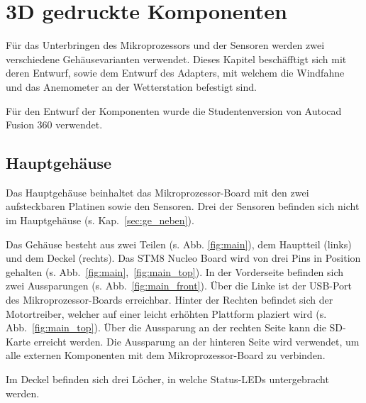 \section{3D gedruckte Komponenten}\label{sec:gehaeuse}
Für das Unterbringen des Mikroprozessors und der Sensoren werden zwei verschiedene Gehäusevarianten verwendet. Dieses Kapitel beschäfftigt sich mit deren Entwurf, sowie dem Entwurf des Adapters, mit welchem die Windfahne und das Anemometer an der Wetterstation befestigt sind.

Für den Entwurf der Komponenten wurde die Studentenversion von Autocad Fusion 360 verwendet.

\subsection{Hauptgehäuse}\label{sec:ge_haupt}
Das Hauptgehäuse beinhaltet das Mikroprozessor-Board mit den zwei aufsteckbaren Platinen sowie den Sensoren. Drei der Sensoren befinden sich nicht im Hauptgehäuse (s. Kap.~\ref{sec:ge_neben}).

Das Gehäuse besteht aus zwei Teilen (s. Abb. \ref{fig:main}), dem Hauptteil (links) und dem Deckel (rechts). Das STM8 Nucleo Board wird von drei Pins in Position gehalten (s. Abb.~\ref{fig:main},~\ref{fig:main_top}). In der Vorderseite befinden sich zwei Aussparungen (s. Abb.~\ref{fig:main_front}). Über die Linke ist der USB-Port des Mikroprozessor-Boards erreichbar. Hinter der Rechten befindet sich der Motortreiber, welcher auf einer leicht erhöhten Plattform plaziert wird (s. Abb.~\ref{fig:main_top}). Über die Aussparung an der rechten Seite kann die SD-Karte erreicht werden. Die Aussparung an der hinteren Seite wird verwendet, um alle externen Komponenten mit dem Mikroprozessor-Board zu verbinden.

Im Deckel befinden sich drei Löcher, in welche Status-LEDs untergebracht werden.

